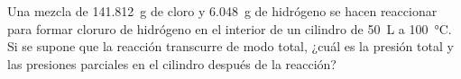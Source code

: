 Una mezcla de \SI{141,812}{\gram} de cloro y \SI{6,048}{\gram} de hidrógeno se hacen reaccionar para formar cloruro de hidrógeno en el interior de un cilindro de \SI{50}{\liter} a \SI{100}{\celsius}. Si se supone que la reacción transcurre de modo total, ¿cuál es la presión total y las presiones parciales en el cilindro después de la reacción?
